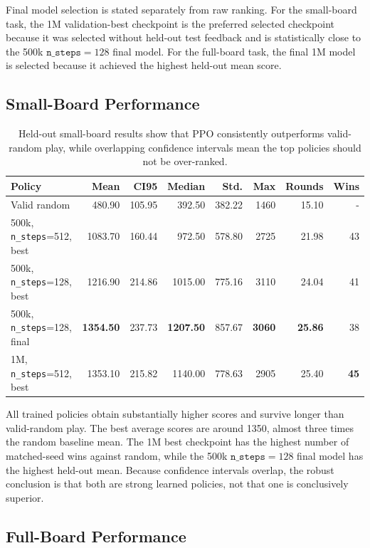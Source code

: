 \documentclass[10pt,a4paper]{article}
\begin{document}
Final model selection is stated separately from raw ranking. For the small-board task, the 1M validation-best checkpoint is the preferred selected checkpoint because it was selected without held-out test feedback and is statistically close to the 500k \(\texttt{n\_steps}=128\) final model. For the full-board task, the final 1M model is selected because it achieved the highest held-out mean score.

\subsection{Small-Board Performance}

\begin{table}[H]
\centering
\caption{Held-out small-board results show that PPO consistently outperforms valid-random play, while overlapping confidence intervals mean the top policies should not be over-ranked.}
\label{tab:small-results}
\small
\begin{tabular}{lrrrrrrr}
\toprule
Policy & Mean & CI95 & Median & Std. & Max & Rounds & Wins \\
\midrule
Valid random & 480.90 & 105.95 & 392.50 & 382.22 & 1460 & 15.10 & - \\
500k, \texttt{n\_steps}=512, best & 1083.70 & 160.44 & 972.50 & 578.80 & 2725 & 21.98 & 43 \\
500k, \texttt{n\_steps}=128, best & 1216.90 & 214.86 & 1015.00 & 775.16 & 3110 & 24.04 & 41 \\
500k, \texttt{n\_steps}=128, final & \textbf{1354.50} & 237.73 & \textbf{1207.50} & 857.67 & \textbf{3060} & \textbf{25.86} & 38 \\
1M, \texttt{n\_steps}=512, best & 1353.10 & 215.82 & 1140.00 & 778.63 & 2905 & 25.40 & \textbf{45} \\
\bottomrule
\end{tabular}
\end{table}

All trained policies obtain substantially higher scores and survive longer than valid-random play. The best average scores are around 1350, almost three times the random baseline mean. The 1M best checkpoint has the highest number of matched-seed wins against random, while the 500k \(\texttt{n\_steps}=128\) final model has the highest held-out mean. Because confidence intervals overlap, the robust conclusion is that both are strong learned policies, not that one is conclusively superior.

\subsection{Full-Board Performance}
\end{document}
